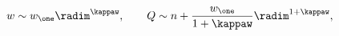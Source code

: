 \begin{equation}
w \sim w_\one \radim^{\kappaw}, \qquad Q \sim n +
\frac{w_\one}{1+\kappaw} \radim^{1+\kappaw},
\end{equation}

